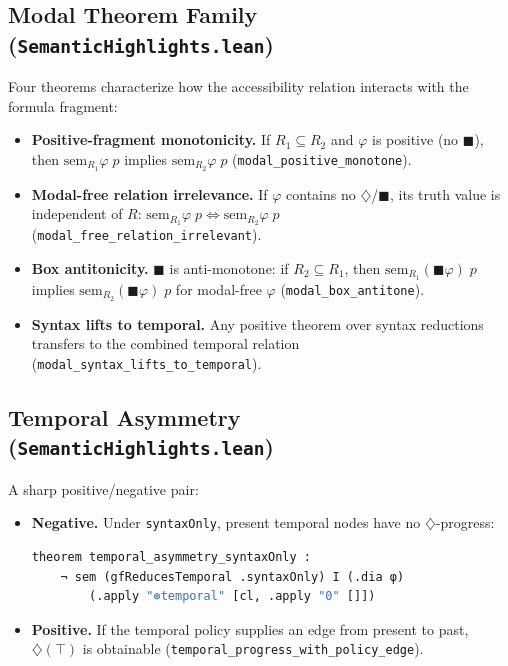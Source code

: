\documentclass[11pt]{article}
\newcommand{\code}[1]{\texttt{#1}}
\newcommand{\Dia}{\ensuremath{\diamondsuit}}
\newcommand{\Bx}{\ensuremath{\blacksquare}}
\begin{document}
\subsection{Modal Theorem Family (\code{SemanticHighlights.lean})}

Four theorems characterize how the accessibility relation interacts with the
formula fragment:

\begin{itemize}
\item \textbf{Positive-fragment monotonicity.}  If $R_1 \subseteq R_2$ and
  $\varphi$ is positive (no $\Bx$), then $\mathrm{sem}_{R_1} \varphi \; p$
  implies $\mathrm{sem}_{R_2} \varphi \; p$
  (\code{modal\_positive\_monotone}).
\item \textbf{Modal-free relation irrelevance.}  If $\varphi$ contains no
  $\Dia$/$\Bx$, its truth value is independent of $R$:
  $\mathrm{sem}_{R_1} \varphi \; p \Leftrightarrow \mathrm{sem}_{R_2} \varphi \; p$
  (\code{modal\_free\_relation\_irrelevant}).
\item \textbf{Box antitonicity.}  $\Bx$ is anti-monotone: if $R_2 \subseteq R_1$,
  then $\mathrm{sem}_{R_1} (\Bx\varphi) \; p$ implies $\mathrm{sem}_{R_2} (\Bx\varphi) \; p$
  for modal-free $\varphi$ (\code{modal\_box\_antitone}).
\item \textbf{Syntax lifts to temporal.}  Any positive theorem over syntax reductions
  transfers to the combined temporal relation
  (\code{modal\_syntax\_lifts\_to\_temporal}).
\end{itemize}

\subsection{Temporal Asymmetry (\code{SemanticHighlights.lean})}

A sharp positive/negative pair:

\begin{itemize}
\item \textbf{Negative.}  Under \code{syntaxOnly}, present temporal nodes
  have no $\Dia$-progress:
\begin{lstlisting}[language=ml]
theorem temporal_asymmetry_syntaxOnly :
    ¬ sem (gfReducesTemporal .syntaxOnly) I (.dia φ)
        (.apply "⊛temporal" [cl, .apply "0" []])
\end{lstlisting}
\item \textbf{Positive.}  If the temporal policy supplies an edge from
  present to past, $\Dia(\top)$ is obtainable
  (\code{temporal\_progress\_with\_policy\_edge}).
\end{itemize}
\end{document}
